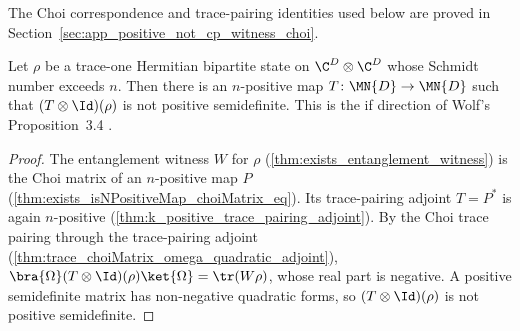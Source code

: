 The Choi correspondence and trace-pairing identities used below are proved in
Section~\ref{sec:app_positive_not_cp_witness_choi}.

\begin{theorem}
    \label{thm:exists_isNPositiveMap_detects}
    \leanok
    Let $\rho$ be a trace-one Hermitian bipartite state on $\C^D\otimes\C^D$ whose Schmidt
    number exceeds $n$. Then there is an $n$-positive map $T\colon\MN{D}\to\MN{D}$ such that
    $(T\otimes\Id)(\rho)$ is not positive semidefinite. This is the if direction of Wolf's
    Proposition~3.4 \cite[Chapter~3, Proposition~3.4]{Wolf2012Quantum}.
\end{theorem}

\begin{proof}
    \leanok
    The entanglement witness $W$ for $\rho$ (\ref{thm:exists_entanglement_witness}) is the
    Choi matrix of an $n$-positive map $P$ (\ref{thm:exists_isNPositiveMap_choiMatrix_eq}).
    Its trace-pairing adjoint $T=P^{*}$ is again $n$-positive
    (\ref{thm:k_positive_trace_pairing_adjoint}). By the Choi trace pairing through the
    trace-pairing adjoint (\ref{thm:trace_choiMatrix_omega_quadratic_adjoint}),
    $\bra{\Omega}(T\otimes\Id)(\rho)\ket{\Omega}=\tr(W\rho)$, whose real part is
    negative. A positive semidefinite matrix has non-negative quadratic forms, so
    $(T\otimes\Id)(\rho)$ is not positive semidefinite.
\end{proof}
